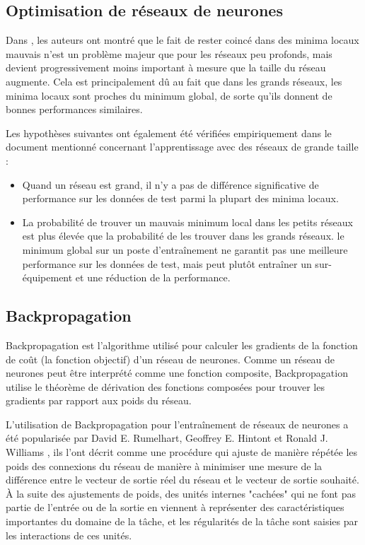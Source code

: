 \subsection{Optimisation de réseaux de neurones}
Dans \cite{Choromanska2014}, les auteurs ont montré que le fait de rester coincé dans des minima locaux mauvais n'est un problème majeur que pour les réseaux peu profonds, mais devient progressivement moins important à mesure que la taille du réseau augmente. Cela est principalement dû au fait que dans les grands réseaux, les minima locaux sont proches du minimum global, de sorte qu'ils donnent de bonnes performances similaires.

Les hypothèses suivantes ont également été vérifiées empiriquement dans le document mentionné concernant l'apprentissage avec des réseaux de grande taille :
\begin{itemize}
    \item Quand un réseau est grand, il n'y a pas de différence significative de performance sur les données de test parmi la plupart des minima locaux.
    \item La probabilité de trouver un mauvais minimum local dans les petits réseaux est plus élevée que la probabilité de les trouver dans les grands réseaux.
    \Trouver le minimum global sur un poste d'entraînement ne garantit pas une meilleure performance sur les données de test, mais peut plutôt entraîner un sur-équipement et une réduction de la performance.
\end{itemize}

\subsection{Backpropagation}
Backpropagation est l'algorithme utilisé pour calculer les gradients de la fonction de coût (la fonction objectif) d'un réseau de neurones. Comme un réseau de neurones peut être interprété comme une fonction composite, Backpropagation utilise le théorème de dérivation des fonctions composées
pour trouver les gradients par rapport aux poids du réseau.

L'utilisation de Backpropagation pour l'entraînement de réseaux de neurones a été popularisée par David E. Rumelhart, Geoffrey E. Hintont et Ronald J. Williams \cite{Rumelhart1986}, ils l'ont décrit comme une procédure qui ajuste de manière répétée les poids des connexions du réseau de manière à minimiser une mesure de la différence entre le vecteur de sortie réel du réseau et le vecteur de sortie souhaité. À la suite des ajustements de poids, des unités internes "cachées" qui ne font pas partie de l'entrée ou de la sortie en viennent à représenter des caractéristiques importantes du domaine de la tâche, et les régularités de la tâche sont saisies par les interactions de ces unités.

